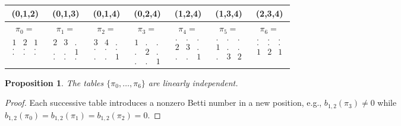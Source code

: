 \documentclass[12pt]{amsart}
\theoremstyle{plain}
\newtheorem{proposition}[thm]{Proposition}
\theoremstyle{definition}
\theoremstyle{remark}
\begin{document}
\begin{table}
\begin{tabular}{|c|c|c|c|c|c|c|}
\hline
(0,1,2) & (0,1,3) & (0,1,4) & (0,2,4) & (1,2,4) & (1,3,4) & (2,3,4) \\
\hline
$\pi_0 =$ & $\pi_1 =$ & $\pi_2 =$ & $\pi_3 =$ & $\pi_4 =$ & $\pi_5 =$ & $\pi_6 =$ \\
$ \begin{array}{ccc}1&2&1\\.&.&.\\.&.&.\end{array}$ &
$ \begin{array}{ccc}2&3&.\\.&.&1\\.&.&.\end{array}$ &
$ \begin{array}{ccc}3&4&.\\.&.&.\\.&.&1\end{array}$ &
$ \begin{array}{ccc}1&.&.\\.&2&.\\.&.&1\end{array}$ &
$ \begin{array}{ccc}.&.&.\\2&3&.\\.&.&1\end{array}$ &
$ \begin{array}{ccc}.&.&.\\1&.&.\\.&3&2\end{array}$ &
$ \begin{array}{ccc}.&.&.\\.&.&.\\1&2&1\end{array}$ \\
\hline
\end{tabular}
\end{table}



\begin{proposition}The tables $\{\pi_0,\dots,\pi_6\}$ are linearly
  independent.  
\end{proposition}
\begin{proof}  Each successive table introduces a nonzero Betti number
  in a new position, e.g., $b_{1,2}(\pi_3)\neq 0$ while
  $b_{1,2}(\pi_0)=b_{1,2}(\pi_1)=b_{1,2}(\pi_2)=0$.  
\end{proof}
\end{document}
